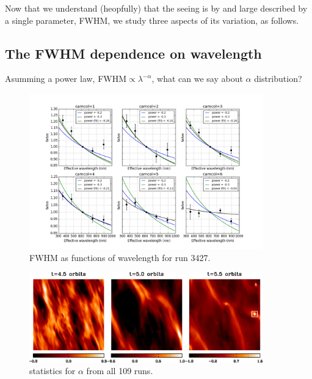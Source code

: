 

Now that we understand (heopfully) that the seeing is by and large described by 
a single parameter, FWHM, we study three aspects of its variation, as follows.


\subsection{The FWHM dependence on wavelength} 

Asumming a power law, FWHM$\propto \lambda^{-\alpha}$, what can we say 
about $\alpha$ distribution? 

\begin{figure}
\centering
\includegraphics[width=0.9\textwidth]{FIGURES/fwhm_lambda.png}
\caption{FWHM as functions of wavelength for run 3427.
\label{fig:fwhm_lambda}}
\end{figure}

\begin{figure}
\centering
\includegraphics[width=0.9\textwidth]{FIGURES/f3.eps}
\caption{statistics for $\alpha$ from all 109 runs.
\label{fig:alpha_stat}}
\end{figure}


